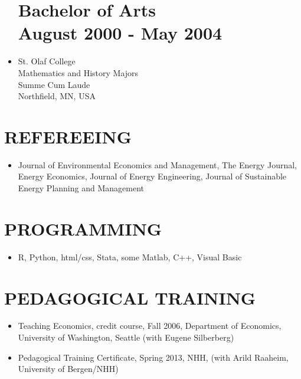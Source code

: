 \documentclass[margin]{res}
\begin{document}
\begin{resume}
\begin{itemize}
\normalsize{\section{\bf Bachelor of Arts \\ August 2000 - May 2004}}
\item[] St. Olaf College  \\
Mathematics and History Majors \\
Summe Cum Laude \\
Northfield, MN, USA \\
\end{itemize}

\section{REFEREEING}  
\begin{itemize}
\item[] Journal of Environmental Economics and Management, The Energy Journal, Energy Economics, Journal of Energy Engineering, Journal of Sustainable Energy Planning and Management
 \end{itemize}

\section{PROGRAMMING}
\begin{itemize}
  \item[] R, Python, html/css, Stata, some Matlab, C++, Visual Basic
\end{itemize}

\section{PEDAGOGICAL TRAINING}
\begin{itemize}
\setlength{\itemsep}{10pt}
\item[] Teaching Economics, credit course, Fall 2006, Department of Economics, University of Washington, Seattle (with Eugene Silberberg)

\item[] Pedagogical Training Certificate, Spring 2013, NHH, (with Arild Raaheim, University of Bergen/NHH)
\end{itemize}


\end{resume}
\end{document}
